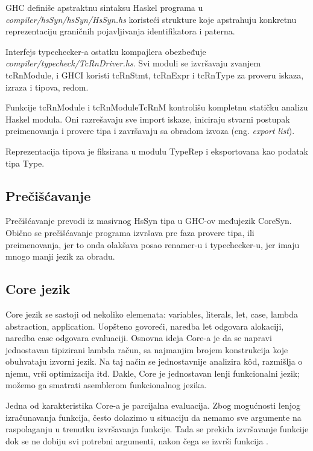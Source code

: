 GHC definiše apstraktnu sintaksu Haskel programa u \\ \textit{compiler/hsSyn/hsSyn/HsSyn.hs}  koristeći strukture koje apstrahuju konkretnu reprezentaciju graničnih pojavljivanja identifikatora i paterna.

Interfejs typechecker-a ostatku kompajlera obezbeđuje \\ \textit{compiler/typecheck/TcRnDriver.hs}. Svi moduli se izvršavaju zvanjem tcRnModule, i GHCI koristi tcRnStmt, tcRnExpr 
i tcRnType za proveru iskaza, izraza i tipova, redom.

Funkcije tcRnModule i tcRnModuleTcRnM kontrolišu kompletnu statičku analizu Haskel modula. Oni razrešavaju sve import iskaze, iniciraju stvarni postupak preimenovanja i provere tipa i završavaju sa obradom izvoza (eng. \emph{export list}).

Reprezentacija tipova je fiksirana u modulu TypeRep i eksportovana kao podatak tipa Type.

\subsection{Prečišćavanje}
\label{subsec:podnaslovDesugar}

Prečišćavanje prevodi iz masivnog HsSyn tipa u GHC-ov međujezik CoreSyn. Obično se prečišćavanje programa izvršava pre faza provere tipa, ili preimenovanja, jer to onda olakšava posao renamer-u i typechecker-u, jer imaju mnogo manji jezik za obradu.

\subsection{Core jezik}
\label{subsec:podnaslovCore}

Core jezik se sastoji od nekoliko elemenata: variables, literals, let, case, lambda abstraction, application. 
Uopšteno govoreći, naredba let odgovara alokaciji, naredba case odgovara evaluaciji.
Osnovna ideja Core-a je da se napravi jednostavan tipizirani lambda račun, sa najmanjim brojem konstrukcija koje obuhvataju izvorni jezik. Na taj način se jednostavnije analizira k\^{o}d, razmišlja o njemu, vrši optimizacija itd.
Dakle, Core je jednostavan lenji funkcionalni jezik; možemo ga smatrati asemblerom funkcionalnog jezika.

Jedna od karakteristika Core-a je parcijalna evaluacija. Zbog mogućnosti lenjog izračunavanja funkcija, često dolazimo u situaciju da nemamo sve argumente na raspolaganju u trenutku izvršavanja funkcije. Tada se prekida izvršavanje funkcije dok se ne dobiju svi potrebni argumenti, nakon čega se izvrši funkcija \cite{Launchbury}. 